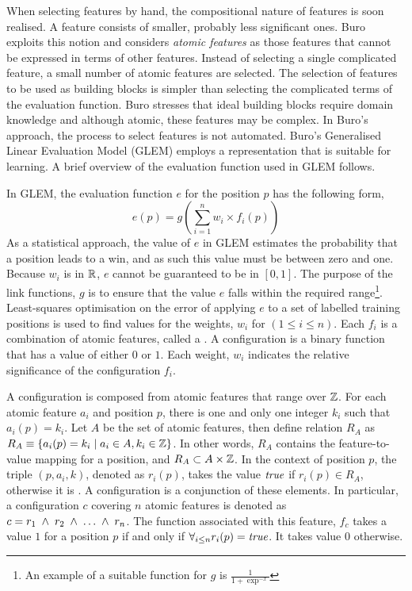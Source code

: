 When selecting features by hand, the compositional nature of features is soon realised.  A feature consists of smaller, probably less significant ones.  Buro exploits this notion and considers {\it atomic features} as those features  that cannot be expressed in terms of other features.  Instead of selecting a single complicated feature,  a small number of atomic features are selected. The selection of features to be used as building blocks is simpler than selecting the complicated terms of the evaluation function.  Buro stresses that ideal building blocks require domain knowledge and although atomic, these features may be complex.  In Buro's approach, the process to select features is not automated.  Buro's Generalised Linear Evaluation Model (GLEM) employs a representation that is suitable for learning. A brief overview of the evaluation function used in GLEM follows.

In GLEM, the evaluation function $e$ for the position $p$  has the following form,
\[
e(p) = g(\sum_{i=1}^n w_i \times f_i(p))
\]
As a statistical approach, the value of $e$ in GLEM estimates the probability that a position leads to a win, and as such this value must be between zero and one.  Because $w_i$ is in ${\mathbb R}$, $e$ cannot be guaranteed to be in $[0,1]$. The purpose of the link functions, $g$ is to ensure that the value $e$ falls within the required range\footnote{An example of a suitable function for $g$ is $\frac{1} {1+\exp^{-x}}$}. Least-squares optimisation on the error of applying $e$  to a set of labelled training positions is used to find values for the weights, $w_i$ for $(1 \leq i \leq n)$. Each $f_i$ is a combination of atomic features, called a .  A configuration is a binary function that has a value of either $0$ or $1$.  Each weight, $w_i$ indicates the relative significance of the configuration $f_i$.  

A configuration is composed from atomic features that range over  $\mathbb Z$. For each atomic feature $a_i$ and position $p$, there is one and only one integer $k_i$ such that  $a_i(p) = k_i$.  Let $A$ be the set of atomic features, then define relation $R_A$ as $R_A \equiv \{ a_i(p) = k_i \; | \; a_i  \in A, k_i \in \mathbb Z\}$. In other words, $R_A$ contains the feature-to-value mapping for a position, and $R_A \subset A \times \mathbb Z$. In the context of  position $p$, the \label{glem_triple} triple $(p,a_i,k)$, denoted as $r_i(p)$, takes the value $\mbox{\it true}$  if $r_i(p) \in R_A$, otherwise it is \myfalse.  A configuration  is a conjunction of these elements.  In particular, a configuration $c$ covering $n$ atomic features is denoted as $c =  r_1 \;\wedge\;  r_2 \;\wedge\; \ldots \;\wedge\; r_n$.   The function associated with this feature, $f_c$ takes a value $1$ for a position $p$ if and only if $\forall_{i\leq n} r_i(p) = \mbox{\mbox{\it true}}$.  It takes value $0$ otherwise. 

